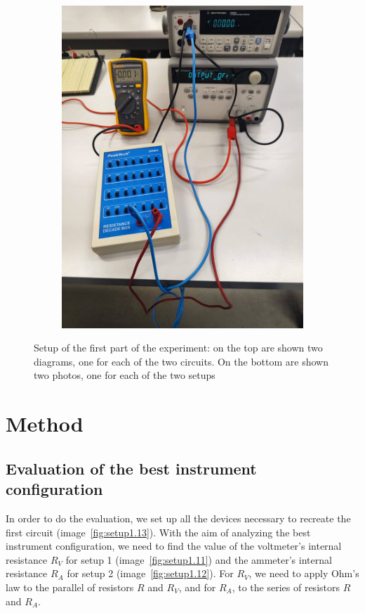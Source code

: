 \documentclass[notitlepage]{report}
\numberwithin{equation}{section}
\theoremstyle{plain}
\theoremstyle{definition}
\theoremstyle{remark}
\begin{document}
\begin{figure}[ht]
\begin{subfigure}[h]{0.45\textwidth}
    \end{subfigure}
    \begin{subfigure}[h]{0.45\textwidth}
        \includegraphics[width=\textwidth]{figures/setup3.jpg}\caption{}\label{fig:setup1.14}
    \end{subfigure}
    \caption{Setup of the first part of the experiment: on the top are shown two
        diagrams, one for each of the two circuits. On the bottom are shown two
    photos, one for each of the two setups}\label{fig:setup_exp1}
\end{figure}



\section{Method}
\subsection{Evaluation of the best instrument configuration}
In order to do the evaluation, we set up all the devices necessary to recreate
the first circuit (image~\ref{fig:setup1.13}). With the aim of analyzing the best instrument
configuration, we need to find the value of the voltmeter's internal resistance
$R_V$ for setup 1 (image~\ref{fig:setup1.11}) and the ammeter's internal resistance $R_A$ for
setup 2 (image~\ref{fig:setup1.12}). For $R_V$, we need to apply Ohm’s law to the parallel of
resistors $R$ and $R_V$, and for $R_A$, to the series of resistors $R$ and
$R_A$.
\end{document}
